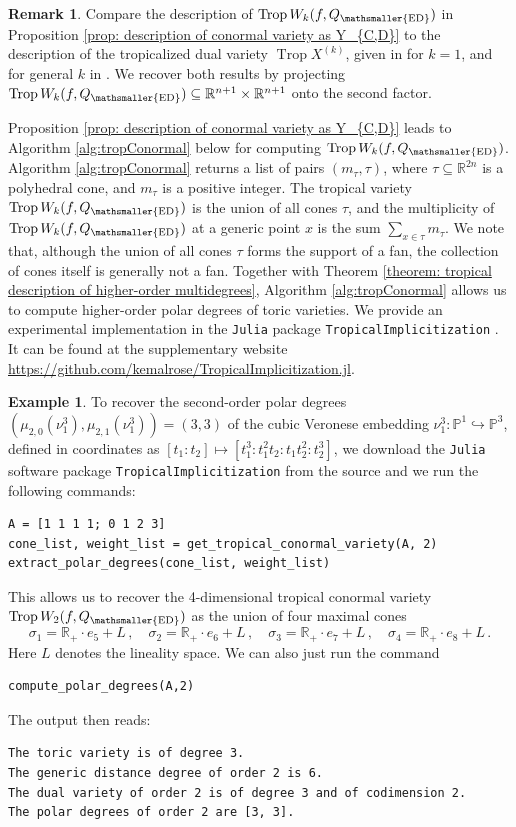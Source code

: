 \documentclass[11pt,reqno]{amsart}
\numberwithin{equation}{section}
\theoremstyle{plain}
\numberwithin{theorem}{section}
\theoremstyle{definition}
\newtheorem{remark}[theorem]{Remark}
\newtheorem{example}[theorem]{Example}
\renewcommand{\P}{\mathbb{P}}
\newcommand{\R}{\mathbb{R}}
\DeclareMathOperator{\Trop}{Trop}
\newcommand{\mED}{\mathsmaller{\mathrm{ED}}}
\begin{document}
\begin{remark}
Compare the description of $\Trop W_k(f,Q_\mED)$ in Proposition \ref{prop: description of conormal variety as Y_{C,D}} to the description of the tropicalized dual variety $\Trop X^{(k)}$, given in \cite[Corollary 4]{Tropical_Discriminants} 
for $k=1$, and for general $k$ in \cite[Theorem 5.3]{Higher_duality_and_toric}.
We recover both results by projecting $\Trop W_k(f,Q_\mED)\subseteq \R^{n+1}\times \R^{n+1}$ onto the second factor.
\end{remark}




Proposition \ref{prop: description of conormal variety as Y_{C,D}} leads to Algorithm \ref{alg:tropConormal} below for computing $\Trop W_k(f,Q_\mED)$. 
Algorithm \ref{alg:tropConormal} returns a list of pairs $(m_\tau,\tau)$, where $\tau \subseteq \R^{2n}$ is a polyhedral cone, and $m_\tau$ is a positive integer. The tropical variety $\Trop W_k(f,Q_\mED)$ is the union of all cones $\tau$, and the multiplicity of $\Trop W_k(f,Q_\mED)$ at a generic point $x$ is the sum $\sum_{x\in\tau}m_\tau$.
We note that, although the union of all cones $\tau$ forms the support of a fan, the collection of cones itself is generally not a fan. 
Together with Theorem \ref{theorem: tropical description of higher-order multidegrees}, Algorithm \ref{alg:tropConormal} allows us to compute higher-order polar degrees of toric varieties.
We provide an experimental implementation in the \verb|Julia| package \texttt{TropicalImplicitization} \cite{Rose2025}. It can be found at the supplementary website
\url{https://github.com/kemalrose/TropicalImplicitization.jl}.



\begin{example}\label{example: code demonstration}
To recover the second-order polar degrees $(\mu_{2,0}(\nu_1^3),\mu_{2,1}(\nu_1^3))=(3,3)$ of the cubic Veronese embedding $\nu_1^3 \colon \P^1 \hookrightarrow \P^3$, defined in coordinates as $[t_1 : t_2] \mapsto [t_1^3 : t_1^2 t_2 : t_1 t_2^2 : t_2^3]$, we download the \verb|Julia| software package
\texttt{TropicalImplicitization} from the source and we run the following commands:
\begin{verbatim}
A = [1 1 1 1; 0 1 2 3]
cone_list, weight_list = get_tropical_conormal_variety(A, 2)
extract_polar_degrees(cone_list, weight_list)
\end{verbatim}
This allows us to recover the 4-dimensional tropical conormal variety $\Trop W_2(f,Q_\mED)$ as the union of four maximal cones
\[
\sigma_1 = \R_+\cdot e_5 + L\,,\quad
\sigma_2 = \R_+\cdot e_6 + L\,,\quad
\sigma_3 = \R_+\cdot e_7 + L\,,\quad
\sigma_4 = \R_+\cdot e_8 + L\,.
\]
Here $L$ denotes the lineality space.
We can also just run the command 
\begin{verbatim}
compute_polar_degrees(A,2)
\end{verbatim}
The output then reads:
\begin{verbatim}
The toric variety is of degree 3.
The generic distance degree of order 2 is 6.
The dual variety of order 2 is of degree 3 and of codimension 2.
The polar degrees of order 2 are [3, 3].
\end{verbatim}
\end{example}
\end{document}

